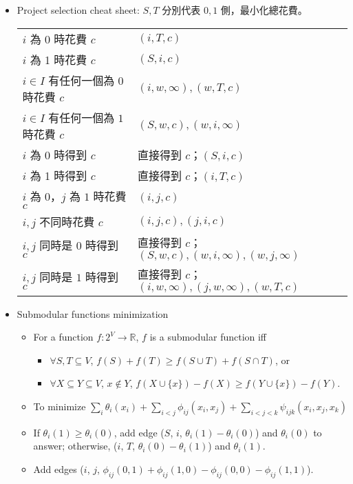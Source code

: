 \begin{itemize}[nosep]
  \item Project selection cheat sheet:
    $S, T$ 分別代表 $0, 1$ 側，最小化總花費。
    \begin{tabular}{|l|l|}
      $i$ 為 0 時花費 $c$ & $(i, T, c)$ \\
      $i$ 為 1 時花費 $c$ & $(S, i, c)$ \\
      $i \in I$ 有任何一個為 $0$ 時花費 $c$ & $(i, w, \infty), (w, T, c)$ \\
      $i \in I$ 有任何一個為 $1$ 時花費 $c$ & $(S, w, c), (w, i, \infty)$ \\
      $i$ 為 0 時得到 $c$ & 直接得到 $c$；$(S, i, c)$ \\
      $i$ 為 1 時得到 $c$ & 直接得到 $c$；$(i, T, c)$ \\
      $i$ 為 0，$j$ 為 $1$ 時花費 $c$ & $(i, j, c)$ \\
      $i, j$ 不同時花費 $c$ & $(i, j, c), (j, i, c)$ \\
      $i, j$ 同時是 $0$ 時得到 $c$ & 直接得到 $c$；$(S, w, c), (w, i, \infty), (w, j, \infty)$ \\
      $i, j$ 同時是 $1$ 時得到 $c$ & 直接得到 $c$；$(i, w, \infty), (j, w, \infty), (w, T, c)$ \\
    \end{tabular}
  \item Submodular functions minimization
    \begin{itemize}[nosep]
      \item For a function $f: 2^V \to \mathbb{R}$, $f$ is a submodular function iff
        \begin{itemize}[nosep]
          \item $\forall S,T \subseteq V$, $f(S) + f(T) \geq f(S \cup T) + f(S \cap T)$, or
          \item $\forall X \subseteq Y \subseteq V$, $x\notin Y$, $f(X\cup\{x\})-f(X)\geq f(Y\cup\{x\})-f(Y)$.
        \end{itemize}
      \item To minimize $\sum_i \theta_i (x_i) + \sum_{i< j} \phi_{ij} (x_i, x_j) + \sum_{i< j< k}  \psi_{ijk} (x_i, x_j, x_k)$
      \item If $\theta_i(1)\geq\theta_i(0)$, add edge ($S$, $i$, $\theta_i(1)-\theta_i(0)$) and $\theta_i(0)$ to answer; otherwise, ($i$, $T$, $\theta_i(0)-\theta_i(1)$) and $\theta_i(1)$.
      \item Add edges ($i$, $j$, $\phi_{ij}(0,1)+\phi_{ij}(1,0)-\phi_{ij}(0,0)-\phi_{ij}(1,1)$).

\end{itemize}
\end{itemize}
